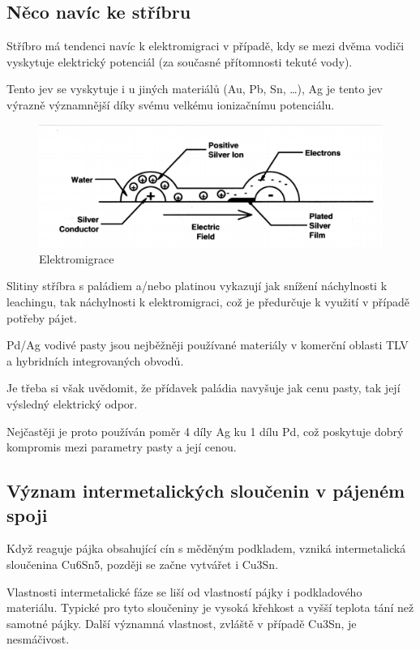 \subsection{Něco navíc ke stříbru}
Stříbro má tendenci navíc k elektromigraci v případě, kdy se mezi dvěma vodiči vyskytuje elektrický potenciál (za současné přítomnosti tekuté vody).

Tento jev se vyskytuje i u jiných materiálů (Au, Pb, Sn, …), Ag je tento jev výrazně
významnější díky svému velkému ionizačnímu potenciálu.

\begin{figure}[h]
   \begin{center}
     \includegraphics[scale=0.6]{images/Migrace.png}
   \end{center}
   \caption{Elektromigrace}
\end{figure}


Slitiny stříbra s paládiem a/nebo platinou vykazují jak snížení náchylnosti k leachingu, tak
náchylnosti k elektromigraci, což je předurčuje k využití v případě potřeby pájet.

Pd/Ag vodivé pasty jsou nejběžněji používané materiály v komerční oblasti TLV a hybridních
integrovaných obvodů.

Je třeba si však uvědomit, že přídavek paládia navyšuje jak cenu pasty, tak její výsledný
elektrický odpor.

Nejčastěji je proto používán poměr 4 díly Ag ku 1 dílu Pd, což poskytuje dobrý kompromis mezi
parametry pasty a její cenou.

\subsection{Význam intermetalických sloučenin v pájeném spoji}
Když reaguje pájka obsahující cín s měděným podkladem, vzniká intermetalická sloučenina Cu6Sn5, později se začne vytvářet i Cu3Sn.

Vlastnosti intermetalické fáze se liší od vlastností pájky i podkladového materiálu. Typické
pro tyto sloučeniny je vysoká křehkost a vyšší teplota tání než samotné pájky. Další významná vlastnost, zvláště v případě Cu3Sn, je nesmáčivost.

